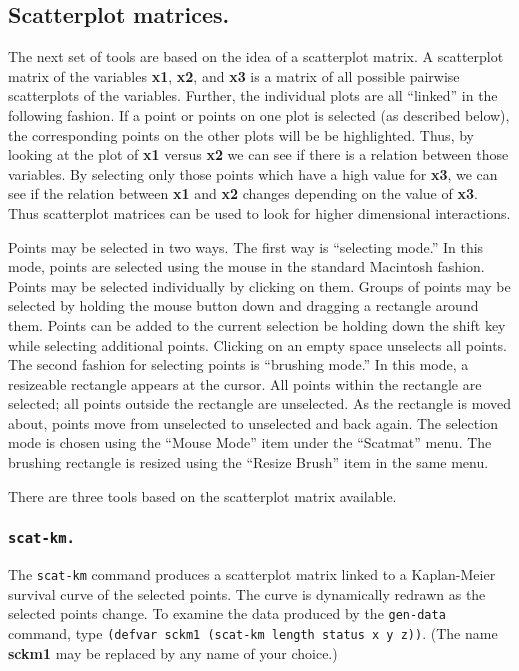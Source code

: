 \documentclass[11pt]{article}
\begin{document}
\subsection{Scatterplot matrices.}
The next set of tools are based on the idea of a scatterplot matrix. A
scatterplot matrix of the variables {\bf x1}, {\bf x2}, and {\bf x3} is a matrix
of all possible pairwise scatterplots of the variables. Further, the individual
plots are all ``linked'' in the following fashion. If a point or points on one
plot is selected (as described below), the corresponding points on the other
plots will be be highlighted. Thus, by looking  at the plot of {\bf x1} versus
{\bf x2} we can see if there is a relation between those variables. By selecting
only those points which have a high value for {\bf x3}, we can see if the
relation between {\bf x1} and {\bf x2} changes depending on the value of {\bf
x3}. Thus scatterplot matrices can be used to look for higher dimensional
interactions.

Points may be selected in two ways. The first way is ``selecting mode.'' In this mode,
points are selected using the mouse in the standard Macintosh fashion. Points may be
selected individually by clicking on them. Groups of points may be selected by
holding the mouse button down and dragging a rectangle around them. Points can be added
to the current selection be holding down the shift key while selecting additional
points. Clicking on an empty space unselects all points. The second fashion for
selecting points is ``brushing mode.'' In this mode, a resizeable rectangle appears at
the cursor. All points within the rectangle are selected; all points outside the
rectangle are unselected. As the rectangle is moved about, points move from unselected
to unselected and back again. The selection mode is chosen using the ``Mouse Mode''
item under the ``Scatmat'' menu. The brushing rectangle is resized using the
``Resize Brush'' item in the same menu.

There are three tools based on the scatterplot matrix available.
\subsubsection{\tt scat-km.}
The {\tt scat-km} command produces a scatterplot matrix linked to a Kaplan-Meier
survival curve of the selected points.
The curve is dynamically redrawn as the selected points change. To examine the data
produced by the {\tt gen-data} command, type
{\tt(defvar sckm1 (scat-km length status x y z))}. (The name {\bf sckm1} may be
replaced by any name of your choice.)
\end{document}
